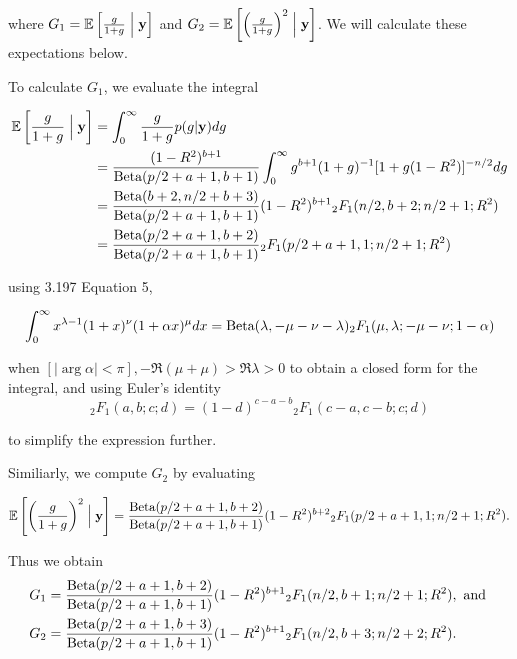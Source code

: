 \documentclass{amsart}[12pt]
\begin{document}
where $G_1 = \mathbb{E}\left[\frac{g}{1 + g} \Bigm| {\bf y} \right]$ and $G_2 = \mathbb{E}\left[ \left(\frac{g}{1 + g} \right)^2 \Bigm| {\bf y} \right]$. We will calculate these expectations below.

To calculate $G_1$, we evaluate the integral

\begin{align*}
	\mathbb{E}\left[\frac{g}{1 + g} \Bigm| {\bf y} \right] & = \int_0^\infty \frac{g}{1 + g} p(g | {\bf y}) dg                                                                      \\
	                                           & = \frac{(1 - R^2)^{b+1}}{\text{Beta}(p/2 + a + 1, b + 1)} \int_0^\infty g^{b+1} (1 + g)^{-1} [1 + g (1 - R^2)]^{-n/2} dg \\
	                                           & = \frac{\text{Beta}(b + 2, n/2 + b + 3)}{\text{Beta}(p /2 + a + 1, b + 1)} (1 - R^2)^{b+1} {}_2 F_1(n/2, b + 2; n/2 + 1; R^2)  \\
	                                           & = \frac{\text{Beta}(p/2 + a + 1, b + 2)}{\text{Beta}(p /2 + a + 1, b + 1)} {}_2 F_1(p/2 + a + 1, 1; n/2 + 1; R^2)              
\end{align*}

using \cite{Gradshteyn1988} 3.197 Equation 5,

\[
	\int_0^\infty x^{\lambda-1} (1+x)^\nu (1 + \alpha x)^{\mu} dx = \text{Beta}(\lambda, -\mu-\nu-\lambda) {}_2 F_1 (\mu, \lambda; -\mu-\nu; 1 - \alpha)
\]

when $[|\arg \alpha| < \pi], -\Re(\mu + \mu) > \Re \lambda > 0$ to obtain a closed form for the integral,  and
using Euler's identity
\[
	{}_2 F_1(a, b; c; d) = (1 - d)^{c - a -  b} {}_2 F_1(c - a, c - b; c; d)
\]

to simplify the expression further.

Similiarly, we compute $G_2$ by evaluating

\[
	\mathbb{E}\left[ \left(\frac{g}{1 + g} \right)^2 \Bigm| {\bf y} \right] = \frac{\text{Beta}(p/2 + a + 1, b + 2)}{\text{Beta}(p /2 + a + 1, b + 1)} (1 - R^2)^{b+2} {}_2 F_1(p/2 + a + 1, 1; n/2 + 1; R^2).
\]

Thus we obtain
\begin{align*}
	G_1 & = \frac{\text{Beta}(p/2 + a + 1, b + 2)}{\text{Beta}(p /2 + a + 1, b + 1)} (1 - R^2)^{b+1} {}_2 F_1(n/2, b + 1; n/2 + 1; R^2), \text{ and } \\
	G_2 & = \frac{\text{Beta}(p/2 + a + 1, b + 3)}{\text{Beta}(p /2 + a + 1, b + 1)} (1 - R^2)^{b+1} {}_2 F_1(n/2, b + 3; n/2 + 2; R^2).              
\end{align*}
\end{document}
